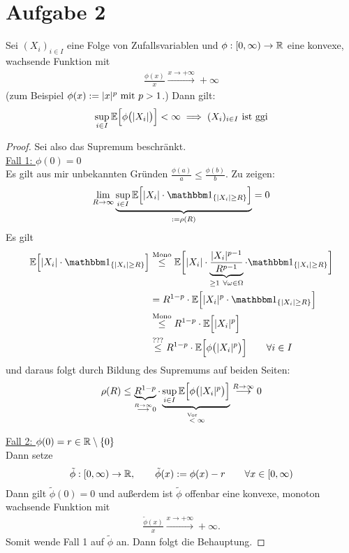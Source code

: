 \documentclass[12pt,a4paper]{article}
\begin{document}
\section*{Aufgabe 2}
Sei $(X_i)_{i\in I}$ eine Folge von Zufallsvariablen und $\phi:[0,\infty)\to\R$ eine konvexe, wachsende Funktion mit 
\begin{align*}
\frac{\phi(x)}{x}\stackrel{x\to+\infty}{\longrightarrow}+\infty
\end{align*}
(zum Beispiel $\phi(x):=|x|^p\mit p>1$.) Dann gilt:
\begin{align*}
\sup\limits_{i\in I}\E\Big[\phi\big(|X_i|\big)\Big]<\infty\implies(X_i)_{i\in I}\text{ ist ggi}
\end{align*}
\begin{proof}
Sei also das Supremum beschränkt.\\

\underline{Fall 1: $\phi(0)=0$}\\
Es gilt aus mir unbekannten Gründen $\frac{\phi(a)}{a}\leq\frac{\phi(b)}{b}$.
Zu zeigen:
\begin{align*}
\lim\limits_{R\to\infty}\underbrace{\sup\limits_{i\in I}
\E\Big[|X_i|\cdot\indi_{\lbrace |X_i|\geq R\rbrace}\Big]}_{:=\rho(R)}=0
\end{align*}
Es gilt
\begin{align*}
\E\Big[|X_i|\cdot\indi_{\lbrace |X_i|\geq R\rbrace}\Big]
&\stackrel{\text{Mono}}{\leq}
\E\bigg[|X_i|\cdot\underbrace{\frac{|X_i|^{p-1}}{R^{p-1}}}_{\geq1~\forall\omega\in\Omega}\cdot\indi_{\lbrace |X_i|\geq R\rbrace}\bigg]\\
&=R^{1-p}\cdot\E\Big[|X_i|^p\cdot\indi_{\lbrace |X_i|\geq R\rbrace}\Big]\\
&\stackrel{\text{Mono}}{\leq}
R^{1-p}\cdot\E\Big[|X_i|^p\Big]\\
&\stackrel{\text{???}}{\leq}
R^{1-p}\cdot\E\Big[\phi\big(|X_i|^p\big)\Big]\qquad\forall i\in I
\end{align*}
und daraus folgt durch Bildung des Supremums auf beiden Seiten:
\begin{align*}
\rho(R)
\stackrel{}{\leq}
\underbrace{R^{1-p}}_{\stackrel{R\to\infty}{\longrightarrow}0}\cdot\underbrace{\sup\limits_{i\in I}\E\Big[\phi\big(|X_i|^p\big)\Big]}_{\stackrel{\text{Vor}}{<}\infty}\stackrel{R\to\infty}{\longrightarrow}0
\end{align*}

\underline{Fall 2: $\phi(0)=r\in\R\setminus\lbrace0\rbrace$}\\
Dann setze
\begin{align*}
\tilde{\phi}:[0,\infty)\to\R,\qquad\tilde{\phi}(x):=\phi(x)-r\qquad\forall x\in[0,\infty)
\end{align*}
Dann gilt $\tilde{\phi}(0)=0$ und außerdem ist $\tilde{\phi}$ offenbar eine konvexe, monoton wachsende Funktion mit
\begin{align*}
\frac{\tilde{\phi}(x)}{x}\stackrel{x\to+\infty}{\longrightarrow}+\infty.
\end{align*}
Somit wende Fall 1 auf $\tilde{\phi}$ an. Dann folgt die Behauptung.

\end{proof}
\end{document}
